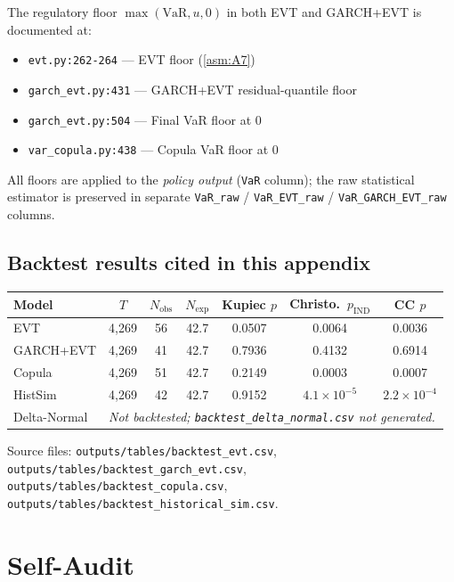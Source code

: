 \documentclass[11pt,a4paper]{article}
\newcommand{\code}[1]{\texttt{#1}}
\begin{document}
The regulatory floor $\max(\text{VaR}, u, 0)$ in both EVT and GARCH+EVT
is documented at:
\begin{itemize}
  \item \code{evt.py:262-264} --- EVT floor (\cref{asm:A7})
  \item \code{garch\_evt.py:431} --- GARCH+EVT residual-quantile floor
  \item \code{garch\_evt.py:504} --- Final VaR floor at 0
  \item \code{var\_copula.py:438} --- Copula VaR floor at 0
\end{itemize}
All floors are applied to the \emph{policy output} (\code{VaR} column);
the raw statistical estimator is preserved in separate \code{VaR\_raw} /
\code{VaR\_EVT\_raw} / \code{VaR\_GARCH\_EVT\_raw} columns.

\subsection{Backtest results cited in this appendix}

\begin{center}
\begin{tabular}{@{}lcccccc@{}}
\toprule
\textbf{Model} & \textbf{$T$} & \textbf{$N_{\text{obs}}$} & \textbf{$N_{\text{exp}}$} &
\textbf{Kupiec $p$} & \textbf{Christo.\ $p_{\text{IND}}$} & \textbf{CC $p$} \\
\midrule
EVT            & 4{,}269 & 56 & 42.7 & 0.0507 & 0.0064 & 0.0036 \\
GARCH+EVT      & 4{,}269 & 41 & 42.7 & 0.7936 & 0.4132 & 0.6914 \\
Copula         & 4{,}269 & 51 & 42.7 & 0.2149 & 0.0003 & 0.0007 \\
HistSim        & 4{,}269 & 42 & 42.7 & 0.9152 & $4.1\times10^{-5}$ & $2.2\times10^{-4}$ \\
Delta-Normal   & \multicolumn{6}{l}{\emph{Not backtested; \code{backtest\_delta\_normal.csv} not generated.}} \\
\bottomrule
\end{tabular}
\end{center}

Source files: \code{outputs/tables/backtest\_evt.csv},
\code{outputs/tables/backtest\_garch\_evt.csv},
\code{outputs/tables/backtest\_copula.csv},
\code{outputs/tables/backtest\_historical\_sim.csv}.

\section*{Self-Audit}\label{sec:audit}
\end{document}
